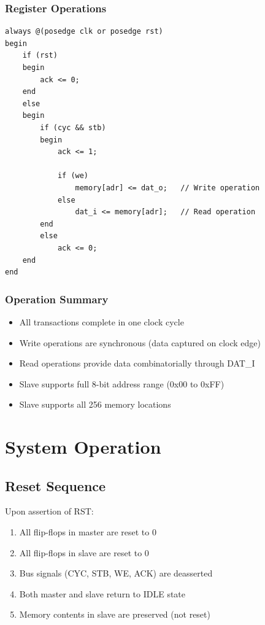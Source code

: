 \documentclass[12pt,a4paper]{article}
\begin{document}
\subsubsection{Register Operations}
\begin{lstlisting}[caption=Slave State Machine Logic]
always @(posedge clk or posedge rst)
begin
    if (rst)
    begin
        ack <= 0;
    end
    else
    begin
        if (cyc && stb)
        begin
            ack <= 1;
            
            if (we)
                memory[adr] <= dat_o;   // Write operation
            else
                dat_i <= memory[adr];   // Read operation
        end
        else
            ack <= 0;
    end
end
\end{lstlisting}

\subsubsection{Operation Summary}
\begin{itemize}
    \item All transactions complete in one clock cycle
    \item Write operations are synchronous (data captured on clock edge)
    \item Read operations provide data combinatorially through DAT\_I
    \item Slave supports full 8-bit address range (0x00 to 0xFF)
    \item Slave supports all 256 memory locations
\end{itemize}

\section{System Operation}

\subsection{Reset Sequence}

Upon assertion of RST:
\begin{enumerate}
    \item All flip-flops in master are reset to 0
    \item All flip-flops in slave are reset to 0
    \item Bus signals (CYC, STB, WE, ACK) are deasserted
    \item Both master and slave return to IDLE state
    \item Memory contents in slave are preserved (not reset)
\end{enumerate}
\end{document}
